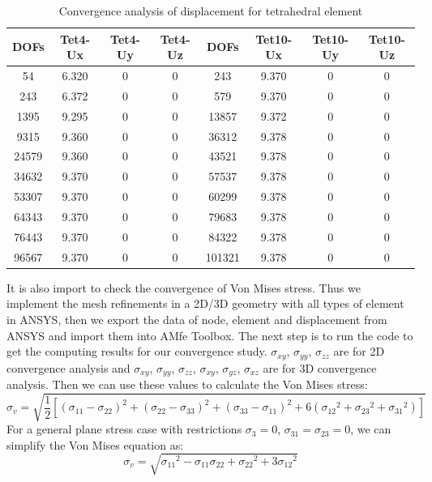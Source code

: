 \begin{table}[ht]
	\caption{Convergence analysis of displacement for tetrahedral element} \label{tab: TetConvergence}
	\begin{tabular}{ c | c | c | c | c | c | c | c} 	
		DOFs & Tet4-Ux & Tet4-Uy & Tet4-Uz & DOFs & Tet10-Ux & Tet10-Uy & Tet10-Uz\\ \hline
		54 & 6.320 & 0 & 0 & 243 & 9.370& 0  & 0 \\ 
		243 & 6.372 & 0 & 0 & 579 & 9.370&0 & 0\\
		1395 & 9.295 & 0 & 0 & 13857 & 9.372&  0 & 0 \\
		9315 & 9.360 &  0 &  0 & 36312&9.378 &0 & 0\\
		24579 & 9.360 &  0 &  0 & 43521 & 9.378&0 & 0\\
		34632 & 9.370 &  0 & 0 &  57537 & 9.378&0 & 0  \\
		53307 & 9.370 &   0 & 0 &  60299 & 9.378&0 & 0 \\
		64343 & 9.370 & 0 &  0 & 79683 & 9.378&0 & 0\\
		76443 & 9.370 & 0 & 0 & 84322 & 9.378 &0 & 0 \\
		96567 & 9.370 & 0 & 0 &  101321 & 9.378& 0& 0\\
		\hline  
	\end{tabular}
\end{table}
It is also import to check the convergence of Von Mises stress. Thus we implement the mesh refinements in a 2D/3D geometry with all types of element in ANSYS, then we export the data of node, element and displacement from ANSYS and import them into AMfe Toolbox. The next step is to run the code to get the computing results for our convergence study. $\sigma_{xy}$, $\sigma_{yy}$, $\sigma_{zz}$ are for 2D convergence analysis and $\sigma_{xy}$, $\sigma_{yy}$, $\sigma_{zz}$, $\sigma_{xy}$, $\sigma_{yz}$, $\sigma_{xz}$ are for 3D convergence analysis.   Then we can use these values to calculate the Von Mises stress: 
\begin{equation}
\sigma_v = \sqrt{\frac{1}{2}\left[\left(\sigma_{11}-\sigma_{22}\right)^2 + \left(\sigma_{22}-\sigma_{33}\right)^2 + \left(\sigma_{33}-\sigma_{11}\right)^2 + 6\left({\sigma_{12}}^2 + {\sigma_{23}}^2 + {\sigma_{31}}^2 \right) \right]}
\end{equation}
For a general plane stress case with restrictions $\sigma_3 = 0$, $\sigma_{31} = \sigma_{23} = 0$, we can simplify the Von Mises equation as:
\begin{equation}
\sigma_v = \sqrt{{\sigma_{11}}^2 - \sigma_{11}\sigma_{22} + {\sigma_{22}}^2 + 3 {\sigma_{12}}^2}
\end{equation}
